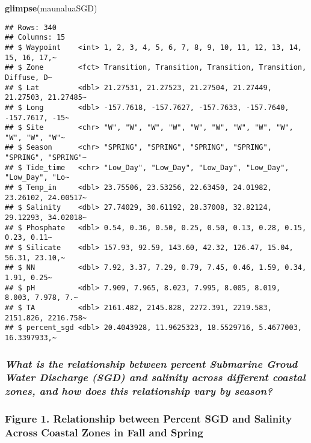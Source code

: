 \documentclass[
]{article}
\newenvironment{Shaded}{\begin{snugshade}}{\end{snugshade}}
\newcommand{\FunctionTok}[1]{\textcolor[rgb]{0.13,0.29,0.53}{\textbf{#1}}}
\newcommand{\NormalTok}[1]{#1}
\begin{document}
\begin{Shaded}
\begin{Highlighting}[]
\FunctionTok{glimpse}\NormalTok{(maunaluaSGD)}
\end{Highlighting}
\end{Shaded}

\begin{verbatim}
## Rows: 340
## Columns: 15
## $ Waypoint    <int> 1, 2, 3, 4, 5, 6, 7, 8, 9, 10, 11, 12, 13, 14, 15, 16, 17,~
## $ Zone        <fct> Transition, Transition, Transition, Transition, Diffuse, D~
## $ Lat         <dbl> 21.27531, 21.27523, 21.27504, 21.27449, 21.27503, 21.27485~
## $ Long        <dbl> -157.7618, -157.7627, -157.7633, -157.7640, -157.7617, -15~
## $ Site        <chr> "W", "W", "W", "W", "W", "W", "W", "W", "W", "W", "W", "W"~
## $ Season      <chr> "SPRING", "SPRING", "SPRING", "SPRING", "SPRING", "SPRING"~
## $ Tide_time   <chr> "Low_Day", "Low_Day", "Low_Day", "Low_Day", "Low_Day", "Lo~
## $ Temp_in     <dbl> 23.75506, 23.53256, 22.63450, 24.01982, 23.26102, 24.00517~
## $ Salinity    <dbl> 27.74029, 30.61192, 28.37008, 32.82124, 29.12293, 34.02018~
## $ Phosphate   <dbl> 0.54, 0.36, 0.50, 0.25, 0.50, 0.13, 0.28, 0.15, 0.23, 0.11~
## $ Silicate    <dbl> 157.93, 92.59, 143.60, 42.32, 126.47, 15.04, 56.31, 23.10,~
## $ NN          <dbl> 7.92, 3.37, 7.29, 0.79, 7.45, 0.46, 1.59, 0.34, 1.91, 0.25~
## $ pH          <dbl> 7.909, 7.965, 8.023, 7.995, 8.005, 8.019, 8.003, 7.978, 7.~
## $ TA          <dbl> 2161.482, 2145.828, 2272.391, 2219.583, 2151.826, 2216.758~
## $ percent_sgd <dbl> 20.4043928, 11.9625323, 18.5529716, 5.4677003, 16.3397933,~
\end{verbatim}

\subsubsection{\texorpdfstring{\emph{What is the relationship between
percent Submarine Groud Water Discharge (SGD) and salinity across
different coastal zones, and how does this relationship vary by
season?}}{What is the relationship between percent Submarine Groud Water Discharge (SGD) and salinity across different coastal zones, and how does this relationship vary by season?}}\label{what-is-the-relationship-between-percent-submarine-groud-water-discharge-sgd-and-salinity-across-different-coastal-zones-and-how-does-this-relationship-vary-by-season}

\subsubsection{Figure 1. Relationship between Percent SGD and Salinity
Across Coastal Zones in Fall and
Spring}\label{figure-1.-relationship-between-percent-sgd-and-salinity-across-coastal-zones-in-fall-and-spring}
\end{document}
